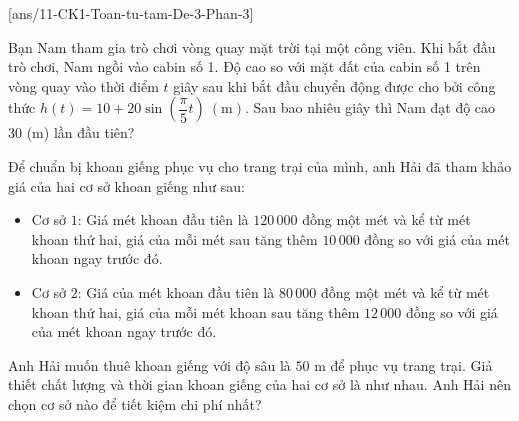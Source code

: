 \caukq
{}[ans/11-CK1-Toan-tu-tam-De-3-Phan-3]
\begin{ex}%
	Bạn Nam tham gia trò chơi vòng quay mặt trời tại một công viên. Khi bắt đầu trò chơi, Nam ngồi vào cabin số 1. Độ cao so với mặt đất của cabin số 1 trên vòng quay vào thời điểm $t$ giây sau khi bắt đầu chuyển động được cho bởi công thức $h(t)=10+20 \sin \left(\dfrac{\pi}{5} t\right)~(\text{m})$. Sau bao nhiêu giây thì Nam đạt độ cao $30$ (m) lần đầu tiên?
\end{ex}
\begin{ex}%
	Để chuẩn bị khoan giếng phục vụ cho trang trại của mình, anh Hải đã tham khảo giá của hai cơ sở khoan giếng như sau:
\begin{itemize}
\item Cơ sở $1$: Giá mét khoan đầu tiên là $120\,000$ đồng một mét và kể từ mét khoan thứ hai, giá của mỗi mét sau tăng thêm $10\,000$ đồng so với giá của mét khoan ngay trước đó.
\item Cơ sở $2$: Giá của mét khoan đầu tiên là $80\,000$ đồng một mét và kể từ mét khoan thứ hai, giá của mỗi mét khoan sau tăng thêm $12\,000$ đồng so với giá của mét khoan ngay trước đó.
\end{itemize}
Anh Hải muốn thuê khoan giếng với độ sâu là $50$ m để phục vụ trang trại.
Giả thiết chất lượng và thời gian khoan giếng của hai cơ sở là như nhau. Anh Hải nên chọn cơ sở nào để tiết kiệm chi phí nhất?
\end{ex}
